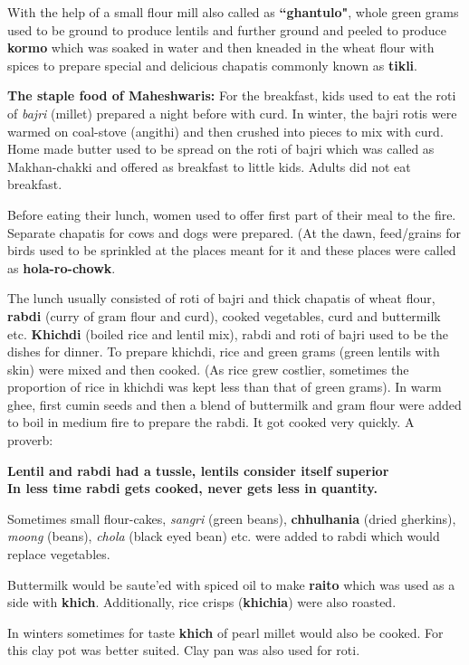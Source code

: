 With the help of a small flour mill also called as \textbf{``ghantulo"}, whole green
grams used to be ground to produce lentils and further ground and peeled to
produce \textbf{kormo} which was soaked in water and then kneaded in the wheat
flour with spices to prepare special and delicious chapatis commonly known as
\textbf{tikli}.

\textbf{The staple food of Maheshwaris:} For the breakfast, kids used to eat the
roti of \textit{bajri} (millet) prepared a night before with curd. In winter, the bajri rotis were
warmed on coal-stove (angithi) and then crushed into pieces to mix with curd.
Home made butter used to be spread on the roti of bajri which was called as
Makhan-chakki and offered as breakfast to little kids. Adults did not eat
breakfast.

Before eating their lunch, women used to offer first part of their meal to the
fire. Separate chapatis for cows and dogs were prepared. (At the dawn,
feed/grains for birds used to be sprinkled at the places meant for it and these
places were called as \textbf{hola-ro-chowk}.

The lunch usually consisted of roti of bajri and thick chapatis of wheat flour,
\textbf{rabdi} (curry of gram flour and curd), cooked vegetables, curd and
buttermilk etc. \textbf{Khichdi} (boiled rice and lentil mix), rabdi and roti of
bajri used to be the dishes for dinner. To prepare khichdi, rice and green
grams (green lentils with skin) were mixed and then cooked. (As rice grew
costlier, sometimes the proportion of rice in khichdi was kept less than that of
green grams). In warm ghee, first cumin seeds and then a blend of buttermilk
and gram flour were added to boil in medium fire to prepare the rabdi. It got
cooked very quickly. A proverb:

\textbf{Lentil and rabdi had a tussle, lentils consider itself superior\\ In
less time rabdi gets cooked, never gets less in quantity.}

Sometimes small flour-cakes, \textit{sangri} (green beans), \textbf{chhulhania}
(dried gherkins), \textit{moong} (beans), \textit{chola} (black eyed bean) etc.
were added to rabdi which would replace vegetables.

Buttermilk would be saut{e}'ed with spiced oil to make \textbf{raito} which was
used as a side with \textbf{khich}. Additionally, rice crisps
(\textbf{khichia}) were also roasted.

In winters sometimes for taste \textbf{khich} of pearl millet would also be cooked.
For this clay pot was better suited. Clay pan was also used for roti.

